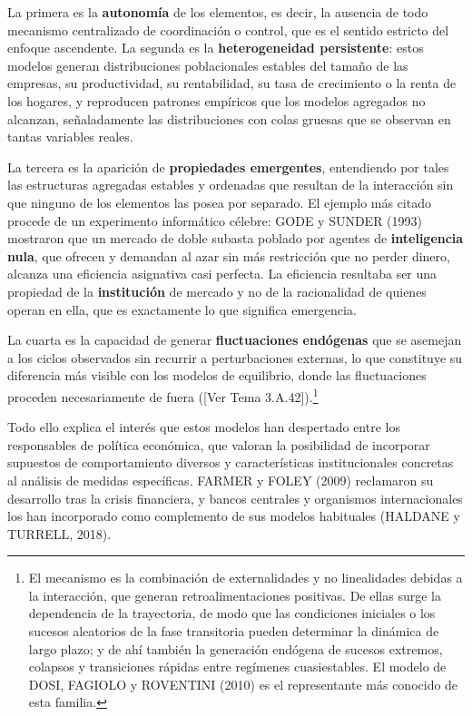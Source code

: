 \documentclass[10pt,a4paper]{article}
\newcommand{\authorfont}[1]{{\fontfamily{EBGaramond-TLF}\selectfont #1}}
\begin{document}
La primera es la \textbf{autonomía} de los elementos, es decir, la ausencia de todo mecanismo centralizado de coordinación o control, que es el sentido estricto del enfoque ascendente. La segunda es la \textbf{heterogeneidad persistente}: estos modelos generan distribuciones poblacionales estables del tamaño de las empresas, su productividad, su rentabilidad, su tasa de crecimiento o la renta de los hogares, y reproducen patrones empíricos que los modelos agregados no alcanzan, señaladamente las distribuciones con colas gruesas que se observan en tantas variables reales.

La tercera es la aparición de \textbf{propiedades emergentes}, entendiendo por tales las estructuras agregadas estables y ordenadas que resultan de la interacción sin que ninguno de los elementos las posea por separado. El ejemplo más citado procede de un experimento informático célebre: GODE y SUNDER (1993) mostraron que un mercado de doble subasta poblado por agentes de \textbf{inteligencia nula}, que ofrecen y demandan al azar sin más restricción que no perder dinero, alcanza una eficiencia asignativa casi perfecta. La eficiencia resultaba ser una propiedad de la \textbf{institución} de mercado y no de la racionalidad de quienes operan en ella, que es exactamente lo que significa emergencia.

La cuarta es la capacidad de generar \textbf{fluctuaciones endógenas} que se asemejan a los ciclos observados sin recurrir a perturbaciones externas, lo que constituye su diferencia más visible con los modelos de equilibrio, donde las fluctuaciones proceden necesariamente de fuera ([\authorfont{Ver Tema 3.A.42}]).\footnote{%
    El mecanismo es la combinación de externalidades y no linealidades debidas a la interacción, que generan retroalimentaciones positivas. De ellas surge la dependencia de la trayectoria, de modo que las condiciones iniciales o los sucesos aleatorios de la fase transitoria pueden determinar la dinámica de largo plazo; y de ahí también la generación endógena de sucesos extremos, colapsos y transiciones rápidas entre regímenes cuasiestables. El modelo de DOSI, FAGIOLO y ROVENTINI (2010) es el representante más conocido de esta familia.
}

Todo ello explica el interés que estos modelos han despertado entre los responsables de política económica, que valoran la posibilidad de incorporar supuestos de comportamiento diversos y características institucionales concretas al análisis de medidas específicas. FARMER y FOLEY (2009) reclamaron su desarrollo tras la crisis financiera, y bancos centrales y organismos internacionales los han incorporado como complemento de sus modelos habituales (HALDANE y TURRELL, 2018).
\end{document}
